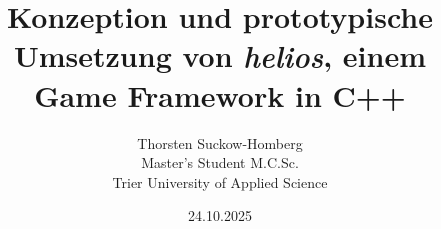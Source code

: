 \documentclass[peerreview]{IEEEtran}
\theoremstyle{definition} %
\begin{document}
\title{Konzeption und prototypische Umsetzung von \textit{helios}, einem Game Framework in C++}



\author{Thorsten Suckow-Homberg \\
Master's Student M.C.Sc.\\
Trier University of Applied Science
}
\date{24.10.2025}

\maketitle
\tableofcontents
\listoffigures
\listoftables

\IEEEpeerreviewmaketitle









\clearpage
\sloppy
\printbibliography
\fussy
\end{document}
